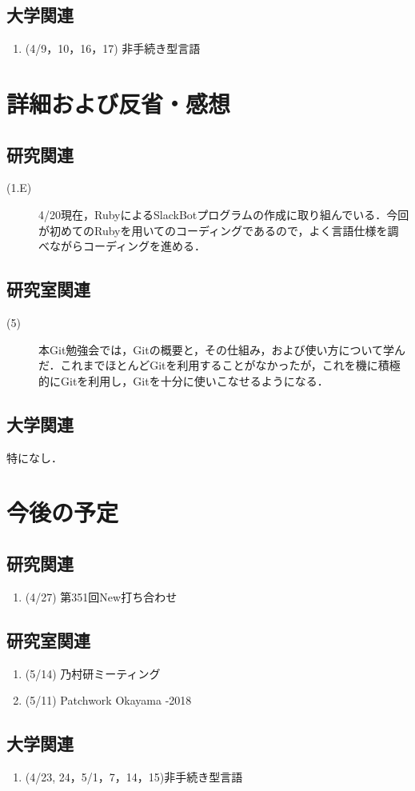 \documentclass[12pt]{jsarticle}
\begin{document}
\subsection{大学関連}\label{daigaku}
\begin{enumerate}
\item (4/9，10，16，17) 非手続き型言語
\end{enumerate}

\section{詳細および反省・感想}
\subsection{研究関連}
\begin{description}
\item[(1.E)] 4/20現在，RubyによるSlackBotプログラムの作成に取り組んでいる．今回が初めてのRubyを用いてのコーディングであるので，よく言語仕様を調べながらコーディングを進める．
\end{description}
\subsection{研究室関連}
\begin{description}
\item[(5)] 本Git勉強会では，Gitの概要と，その仕組み，および使い方について学んだ．これまでほとんどGitを利用することがなかったが，これを機に積極的にGitを利用し，Gitを十分に使いこなせるようになる．
\end{description}
\subsection{大学関連}
特になし．

\section{今後の予定}
\subsection{研究関連}
\begin{enumerate}
\item (4/27) 第351回New打ち合わせ
\end{enumerate}
\subsection{研究室関連}
\begin{enumerate}
\item (5/14) 乃村研ミーティング
\item (5/11) Patchwork Okayama -2018
\end{enumerate}
\subsection{大学関連}
\begin{enumerate}
\item (4/23, 24，5/1，7，14，15)非手続き型言語 
\end{enumerate}


%
\end{document}
